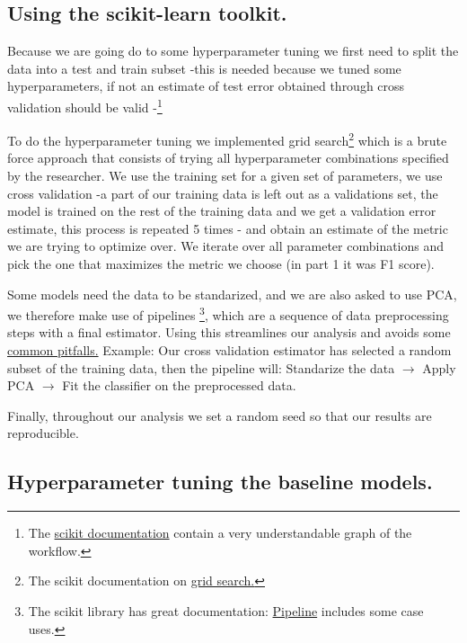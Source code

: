\documentclass{article}
\begin{document}
\subsection{Using the scikit-learn toolkit.}
Because we are going do to some hyperparameter tuning we first need to split the data into a test and train subset -this is needed because we tuned some hyperparameters, if not an estimate of test error obtained through cross validation should be valid -\footnote{The \href{https://scikit-learn.org/1.5/modules/cross_validation.html}{scikit documentation} contain a very understandable graph of the workflow.}

To do the hyperparameter tuning we implemented grid search\footnote{The scikit documentation on \href{https://scikit-learn.org/1.5/modules/grid_search.html}{grid search.}
} which is a brute force approach that consists of trying all hyperparameter combinations specified by the researcher. 
We use the training set for a given set of parameters, we use cross validation -a part of our training data is left out as a validations set, the model is trained on the rest of the training data and we get a validation error estimate, this process is repeated 5 times - and obtain an estimate of the metric we are trying to optimize over.
We iterate over all parameter combinations and pick the one that maximizes the metric we choose (in part 1 it was F1 score).

Some models need the data to be standarized, and we are also asked to use PCA, we therefore make use of pipelines \footnote{The scikit library has great documentation:
\href{https://scikit-learn.org/stable/modules/generated/sklearn.pipeline.Pipeline.html}{Pipeline} includes some case uses.}, which are a sequence of data preprocessing steps with a final estimator. Using this 
streamlines our analysis and avoids some \href{https://scikit-learn.org/stable/common_pitfalls.html}{common pitfalls.}
Example: Our cross validation estimator has selected a random subset of the training data, then the pipeline will: Standarize the data $\rightarrow$ Apply PCA $\rightarrow$ Fit the classifier on the preprocessed data.

Finally, throughout our analysis we set a random seed so that our results are reproducible.

\subsection{Hyperparameter tuning the baseline models.}
\end{document}
